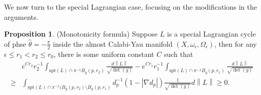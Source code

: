 \documentclass{article}
\theoremstyle{definition}
\newtheorem{prop}[thm]{Proposition}
\newcommand{\norm}[1]{\left\lVert#1\right\rVert}
\begin{document}
				
				We now turn to the special Lagrangian case, focusing on the modifications in the arguments.
				
				
					\begin{prop}\label{prop:monotonicitySlag}
					(Monotonicity formula) Suppose $ L$ is a special Lagrangian cycle
					of phse $\hat{\theta}= -\frac{\pi}{2}$ inside the almost Calabi-Yau manifold $(X, \omega_\epsilon, \Omega_\epsilon)$, then for any $\epsilon \leq r_1<r_2\leq r_0$, there is some uniform constant $C$ such that
					\[
					\begin{split}
						&	e^{Cr_2}	r_2^{-1} \int_{ \text{spt}(L)\cap \pi^{-1}B_g(p,r_2)} \frac{ d\norm{L}   }{  \sqrt{\det(g)}  }  - e^{Cr_1}	r_1^{-1} \int_{ \text{spt}(L)\cap \pi^{-1}B_g(p,r_1)}\frac{   d\norm{L}     }{  \sqrt{\det(g)}  } 
						\\
						\geq &  
						\int_{    \text{spt}(L) \cap \pi^{-1} (B_g(p, r_2)\setminus B_g(p, r_1)  }  d_p^{-1} ( 1- |\nabla d_p| ) \frac{1}{  \sqrt{\det(g)}  } d\norm{ L}  \geq 0.
					\end{split}
					\]
					
					
					
				
				\end{prop}
				
				
				
				
				
\end{document}
